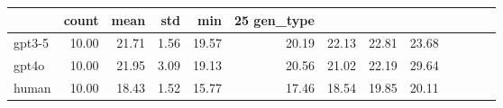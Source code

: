 \begin{tabular}{lrrrrrrrr}
\toprule
 & count & mean & std & min & 25%
gen_type &  &  &  &  &  &  &  &  \\
\midrule
gpt3-5 & 10.00 & 21.71 & 1.56 & 19.57 & 20.19 & 22.13 & 22.81 & 23.68 \\
gpt4o & 10.00 & 21.95 & 3.09 & 19.13 & 20.56 & 21.02 & 22.19 & 29.64 \\
human & 10.00 & 18.43 & 1.52 & 15.77 & 17.46 & 18.54 & 19.85 & 20.11 \\
\bottomrule
\end{tabular}
